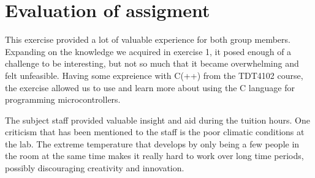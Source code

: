 \chapter{Evaluation of assigment}

This exercise provided a lot of valuable experience for both group members. Expanding on the knowledge we acquired in exercise 1, it posed enough of a challenge to be interesting, but not so much that it became overwhelming and felt unfeasible. Having some expreience with C(++) from the TDT4102 course, the exercise allowed us to use and learn more about using the C language for programming microcontrollers.

The subject staff provided valuable insight and aid during the tuition hours. One criticism that has been mentioned to the staff is the poor climatic conditions at the lab. The extreme temperature that develops by only being a few people in the room at the same time makes it really hard to work over long time periods, possibly discouraging creativity and innovation.
